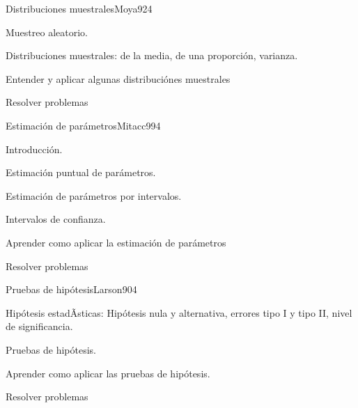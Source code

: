 \begin{syllabus}
\begin{unit}{Distribuciones muestrales}{Moya92}{4}
   \begin{topics}
         \item  Muestreo aleatorio.
	 \item  Distribuciones muestrales: de la media, de una proporción, varianza.
   \end{topics}

   \begin{unitgoals}
         \item  Entender y aplicar algunas distribuciónes muestrales
         \item  Resolver problemas
   \end{unitgoals}
\end{unit}

\begin{unit}{Estimación de parámetros}{Mitacc99}{4}
   \begin{topics}
         \item  Introducción.
	 \item  Estimación puntual de parámetros.
	\item Estimación de parámetros por intervalos.
	\item Intervalos de confianza.
   \end{topics}

   \begin{unitgoals}
         \item  Aprender como aplicar la estimación de parámetros
         \item  Resolver problemas
   \end{unitgoals}
\end{unit}

\begin{unit}{Pruebas de hipótesis}{Larson90}{4}
   \begin{topics}
         \item  Hipótesis estadÃ­sticas: Hipótesis nula y alternativa, errores tipo I y tipo II, nivel de significancia.
	 \item  Pruebas de hipótesis.
   \end{topics}

   \begin{unitgoals}
         \item  Aprender como aplicar las pruebas de hipótesis.
         \item  Resolver problemas
   \end{unitgoals}
\end{unit}

\begin{coursebibliography}
\end{coursebibliography}

\end{syllabus}

